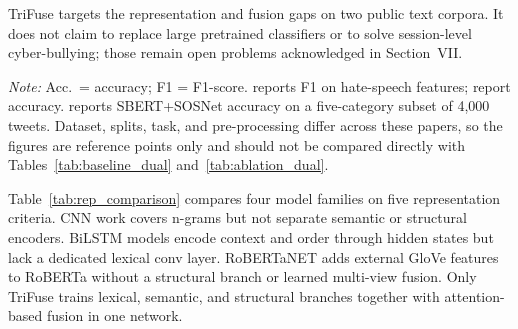 \documentclass[journal]{IEEEtran}
\begin{document}
TriFuse targets the representation and fusion gaps on two public text corpora. It does not claim to replace large pretrained classifiers or to solve session-level cyber-bullying; those remain open problems acknowledged in Section~VII.

\begin{table}[!t]
\caption{Comparative Summary of State-of-the-Art Cyber-bullying Detection Approaches}
\label{tab:sota_comparison}
\centering
{}
\vspace{2pt}
{\footnotesize \textit{Note:} Acc.\ = accuracy; F1 = F1-score. \cite{ref2} reports F1 on hate-speech features; \cite{ref14,ref15,ref26,ref31,ref33,ref34} report accuracy. \cite{ref17} reports SBERT+SOSNet accuracy on a five-category subset of 4,000 tweets. Dataset, splits, task, and pre-processing differ across these papers, so the figures are reference points only and should not be compared directly with Tables~\ref{tab:baseline_dual} and~\ref{tab:ablation_dual}.}

\end{table}

Table~\ref{tab:rep_comparison} compares four model families on five representation criteria. CNN work \cite{ref7,ref26} covers n-grams but not separate semantic or structural encoders. BiLSTM models \cite{ref8,ref13} encode context and order through hidden states but lack a dedicated lexical conv layer. RoBERTaNET \cite{ref15} adds external GloVe features to RoBERTa without a structural branch or learned multi-view fusion. Only TriFuse trains lexical, semantic, and structural branches together with attention-based fusion in one network.
\end{document}
